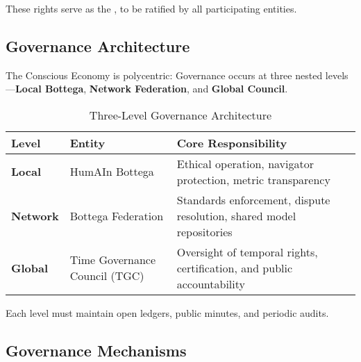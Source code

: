 These rights serve as the , to be ratified by all participating entities.

\subsection{Governance Architecture}
\label{sec:governance-architecture}

The Conscious Economy is polycentric: Governance occurs at three nested levels—\textbf{Local Bottega}, \textbf{Network Federation}, and \textbf{Global Council}.

\begin{table}[h]
\centering
\caption{Three-Level Governance Architecture}
\label{tab:governance-levels}
\begin{tabular}{p{2.5cm}p{3.5cm}p{6cm}}
\toprule
\textbf{Level} & \textbf{Entity} & \textbf{Core Responsibility} \\
\midrule
\textbf{Local} & HumAIn Bottega & Ethical operation, navigator protection, metric transparency \\
\addlinespace
\textbf{Network} & Bottega Federation & Standards enforcement, dispute resolution, shared model repositories \\
\addlinespace
\textbf{Global} & Time Governance Council (TGC) & Oversight of temporal rights, certification, and public accountability \\
\bottomrule
\end{tabular}
\end{table}

Each level must maintain open ledgers, public minutes, and periodic audits.

\subsection{Governance Mechanisms}
\label{sec:governance-mechanisms}

